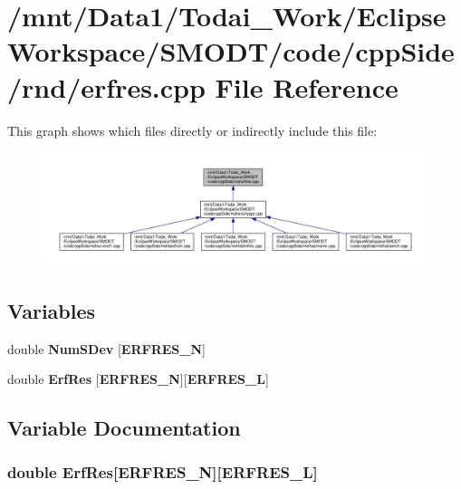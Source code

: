 \section{/mnt/\-Data1/\-Todai\-\_\-\-Work/\-Eclipse\-Workspace/\-S\-M\-O\-D\-T/code/cpp\-Side/rnd/erfres.cpp File Reference}
\label{rnd_2erfres_8cpp}
This graph shows which files directly or indirectly include this file\-:
\nopagebreak
\begin{figure}[H]
\begin{center}
\leavevmode
\includegraphics[width=350pt]{rnd_2erfres_8cpp__dep__incl}
\end{center}
\end{figure}
\subsection*{Variables}
\begin{DoxyCompactItemize}
\item 
double {\bf Num\-S\-Dev} [{\bf E\-R\-F\-R\-E\-S\-\_\-\-N}]
\item 
double {\bf Erf\-Res} [{\bf E\-R\-F\-R\-E\-S\-\_\-\-N}][{\bf E\-R\-F\-R\-E\-S\-\_\-\-L}]
\end{DoxyCompactItemize}


\subsection{Variable Documentation}
\subsubsection[{Erf\-Res}]{\setlength{\rightskip}{0pt plus 5cm}double Erf\-Res[{\bf E\-R\-F\-R\-E\-S\-\_\-\-N}][{\bf E\-R\-F\-R\-E\-S\-\_\-\-L}]}\label{rnd_2erfres_8cpp_a532e3be570cd6f91d0e35bf278570579}


